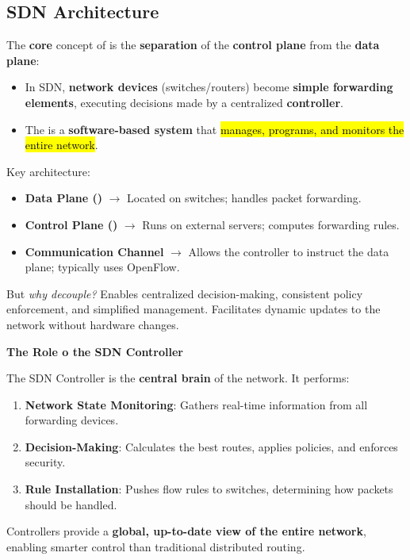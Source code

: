 \subsection{SDN Architecture}\label{subsection: SDN Architecture}

The \textbf{core} concept of  is the \textbf{separation} of the \textbf{control plane} from the \textbf{data plane}:
\begin{itemize}
    \item In SDN, \textbf{network devices} (switches/routers) become \textbf{simple forwarding elements}, executing decisions made by a centralized \textbf{controller}.
    \item The  is a \textbf{software-based system} that \hl{manages, programs, and monitors the entire network}.
\end{itemize}
Key architecture:
\begin{itemize}
    \item \textbf{Data Plane ()} $\rightarrow$ Located on switches; handles packet forwarding.
    \item \textbf{Control Plane ()} $\rightarrow$ Runs on external servers; computes forwarding rules.
    \item \textbf{Communication Channel} $\rightarrow$ Allows the controller to instruct the data plane; typically uses OpenFlow.
\end{itemize}
But \emph{why decouple?} Enables centralized decision-making, consistent policy enforcement, and simplified management. Facilitates dynamic updates to the network without hardware changes.

\highspace
\begin{flushleft}
    \textcolor{Green3}{ \textbf{The Role o the SDN Controller}}
\end{flushleft}
The SDN Controller is the \textbf{central brain} of the network. It performs:
\begin{enumerate}[label=\textcolor{Green3}{\faIcon{check}}]
    \item \textcolor{Green3}{\textbf{Network State Monitoring}}: Gathers real-time information from all forwarding devices.
    \item \textcolor{Green3}{\textbf{Decision-Making}}: Calculates the best routes, applies policies, and enforces security.
    \item \textcolor{Green3}{\textbf{Rule Installation}}: Pushes flow rules to switches, determining how packets should be handled.
\end{enumerate}
Controllers provide a \textbf{global, up-to-date view of the entire network}, enabling smarter control than traditional distributed routing.

